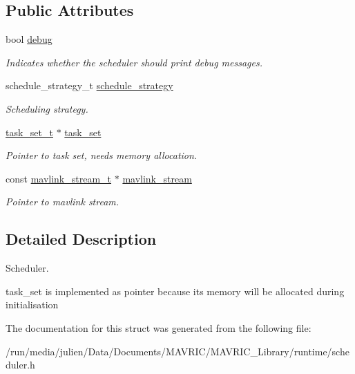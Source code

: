 \subsection*{Public Attributes}
\begin{DoxyCompactItemize}
\item 
\hypertarget{structscheduler__t_a684057cae59e5faf32118d929ecbd00e}{bool \hyperlink{structscheduler__t_a684057cae59e5faf32118d929ecbd00e}{debug}}\label{structscheduler__t_a684057cae59e5faf32118d929ecbd00e}

\begin{DoxyCompactList}\small\item\em Indicates whether the scheduler should print debug messages. \end{DoxyCompactList}\item 
\hypertarget{structscheduler__t_ae30f0b746585b662cf594cc02ae0bd52}{schedule\+\_\+strategy\+\_\+t \hyperlink{structscheduler__t_ae30f0b746585b662cf594cc02ae0bd52}{schedule\+\_\+strategy}}\label{structscheduler__t_ae30f0b746585b662cf594cc02ae0bd52}

\begin{DoxyCompactList}\small\item\em Scheduling strategy. \end{DoxyCompactList}\item 
\hypertarget{structscheduler__t_a3c4b0f5c56e33ac45048b0450f8df85b}{\hyperlink{structtask__set__t}{task\+\_\+set\+\_\+t} $\ast$ \hyperlink{structscheduler__t_a3c4b0f5c56e33ac45048b0450f8df85b}{task\+\_\+set}}\label{structscheduler__t_a3c4b0f5c56e33ac45048b0450f8df85b}

\begin{DoxyCompactList}\small\item\em Pointer to task set, needs memory allocation. \end{DoxyCompactList}\item 
\hypertarget{structscheduler__t_ad9244de9de07ffa65fbf0f3e1dc1a426}{const \hyperlink{structmavlink__stream__t}{mavlink\+\_\+stream\+\_\+t} $\ast$ \hyperlink{structscheduler__t_ad9244de9de07ffa65fbf0f3e1dc1a426}{mavlink\+\_\+stream}}\label{structscheduler__t_ad9244de9de07ffa65fbf0f3e1dc1a426}

\begin{DoxyCompactList}\small\item\em Pointer to mavlink stream. \end{DoxyCompactList}\end{DoxyCompactItemize}


\subsection{Detailed Description}
Scheduler. 

task\+\_\+set is implemented as pointer because its memory will be allocated during initialisation 

The documentation for this struct was generated from the following file\+:\begin{DoxyCompactItemize}
\item 
/run/media/julien/\+Data/\+Documents/\+M\+A\+V\+R\+I\+C/\+M\+A\+V\+R\+I\+C\+\_\+\+Library/runtime/scheduler.\+h\end{DoxyCompactItemize}
